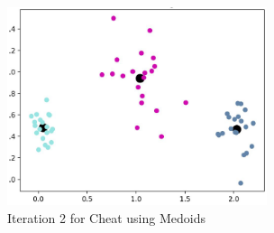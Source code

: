 \documentclass[11pt]{article}
\begin{document}
\begin{enumerate}
{\begin{figure}[!htbp]
    \includegraphics[width=3in]{2cheatcentroid.png}
    \caption{Iteration 2 for Cheat using Medoids} 
\end{figure} \\
}
\end{enumerate}
\newpage
\end{document}
